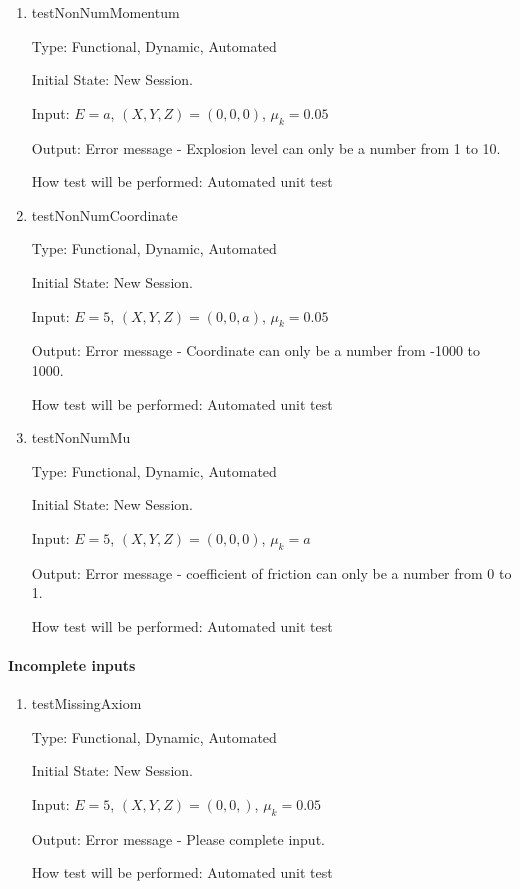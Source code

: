 \documentclass[12pt, titlepage]{article}
\begin{document}
\begin{enumerate}

\item{testNonNumMomentum\\}

Type: Functional, Dynamic, Automated

Initial State: New Session.

Input: $E = a$, $(X,Y,Z) = (0,0,0)$, $\mu_{k} = 0.05$  

Output: Error message - Explosion level can only be a number from 1 to 10.

How test will be performed: Automated unit test

\item{testNonNumCoordinate\\}

Type: Functional, Dynamic, Automated

Initial State: New Session.

Input: $E = 5$, $(X,Y,Z) = (0,0,a)$, $\mu_{k} = 0.05$  

Output: Error message - Coordinate can only be a number from -1000 to 1000.

How test will be performed: Automated unit test

\item{testNonNumMu\\}

Type: Functional, Dynamic, Automated

Initial State: New Session.

Input: $E = 5$, $(X,Y,Z) = (0,0,0)$, $\mu_{k} = a$  

Output: Error message - coefficient of friction can only be a number from 0 to 1.

How test will be performed: Automated unit test

\end{enumerate}

\paragraph{Incomplete inputs}

\begin{enumerate}

\item{testMissingAxiom\\}

Type: Functional, Dynamic, Automated

Initial State: New Session.

Input: $E = 5$, $(X,Y,Z) = (0,0,)$, $\mu_{k} = 0.05$  

Output: Error message - Please complete input.

How test will be performed: Automated unit test 

\end{enumerate}
\end{document}
